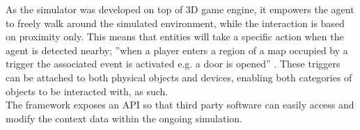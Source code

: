 As the simulator was developed on top of 3D game engine, it empowers the agent to freely walk around the simulated environment, while the interaction is based on proximity only. This means that entities will take a specific action when the agent is detected nearby; ''when a player enters a region of a map occupied by a trigger
the associated event is activated e.g. a door is opened'' \cite{o2005testbed}. These triggers can be attached to both physical objects and devices, enabling both categories of objects to be interacted with, as such.\\

The framework exposes an API so that third party software can easily access and modify the context data within the ongoing simulation.
